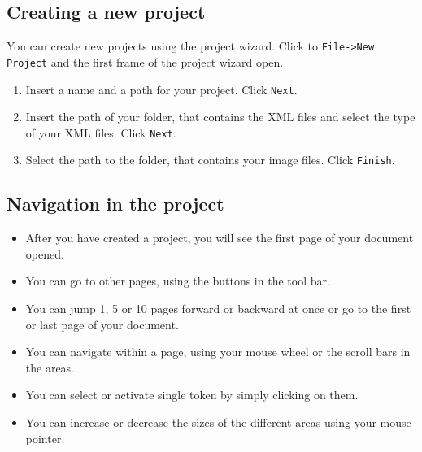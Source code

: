 \subsection{Creating a new project}
\begin{frame}

	You can create new projects using the project wizard. Click to
	\texttt{File->New Project} and the first frame of the project wizard
	open.
	\begin{enumerate}
		\item Insert a name and a path for your project. Click \texttt{Next}.
		\item Insert the path of your folder, that contains the XML files and
			select the type of your XML files. Click \texttt{Next}.
		\item Select the path to the folder, that contains your image
			files. Click \texttt{Finish}.
	\end{enumerate}
\end{frame}

\subsection{Navigation in the project}
\begin{frame}
	\begin{itemize}
		\item After you have created a project, you will see the first page of
			your document opened.
		\item You can go to other pages, using the buttons in the tool bar.
		\item You can jump 1, 5 or 10 pages forward or backward at once or go to
			the first or last page of your document.
		\item You can navigate within a page, using your mouse wheel or the
			scroll bars in the areas.
		\item You can select or activate single token by simply clicking on them.
		\item You can increase or decrease the sizes of the different areas using
			your mouse pointer.
	\end{itemize}
\end{frame}


